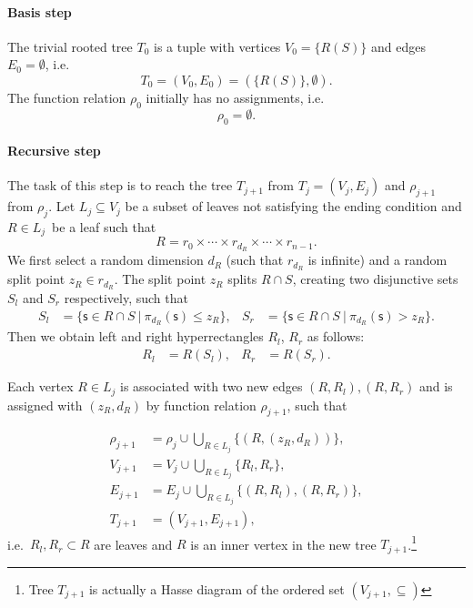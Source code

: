 \paragraph{Basis step}
The trivial rooted tree \(T_0\) is a tuple with
vertices \(V_0 = \{R(S)\}\) and edges \(E_0 = \emptyset\), i.e. 
\[T_0= (V_0, E_0) = (\{R(S)\},\emptyset).\]
The function relation $\rho_0$ initially has no assignments, i.e.
$$\rho_0 = \emptyset.$$

\paragraph{Recursive step}
The task of this step is to reach the tree \(T_{j+1}\) from \(T_{j} = (V_j, E_j)\) and $\rho_{j+1}$ from $\rho_{j}.$
Let \(L_j \subseteq V_j\) be a subset of leaves not satisfying the
ending condition
and \(R \in L_j\)\ be a leaf such that
\[R =  r_0 \times \cdots \times r_{d_R} \times \cdots \times r_{n-1}. \]
We first select a random dimension $d_R$ (such that $r_{d_R}$ is infinite) and a random split point $z_R \in r_{d_R}$.
The split point $z_R$ splits $R \cap S$, creating two disjunctive sets $S_l$ and $S_r$ respectively, such that
\begin{align*}
S_l &= \{ \mathsf{s} \in{R \cap S}\ |\ \pi_{d_R}(\mathsf{s})\le z_R\},&
S_r &= \{ \mathsf{s} \in{R \cap S}\ |\ \pi_{d_R}(\mathsf{s}) > z_R\}.
\end{align*}
Then we obtain left and right hyperrectangles \(R_l\), \(R_r\) as
follows:
\begin{align*}
R_l &= R(S_l),&
R_r &= R(S_r).
\end{align*}

Each vertex \(R \in L_j\) is associated with two new
edges \((R,R_l ), (R, R_r)\) and is assigned with $(z_R,d_R)$ by function relation $\rho_{j+1}$, such that


\begin{align*}
   \rho_{j+1} &= \rho_j \cup \bigcup_{R \in L_j} \{(R, (z_R, d_R))\}, \\
   V_{j+1} &= V_j \cup \bigcup_{R \in L_j} \{R_l, R_r\}, \\
   E_{j+1} &= E_j \cup \bigcup_{R \in L_j} \{(R, R_l), (R,R_r)\},\\
   T_{j+1} &= (V_{j+1}, E_{j+1}),
\end{align*}
i.e.~${R_l, R_r} \subset R$ are leaves and $R$ is an inner vertex in the new tree
\(T_{j+1}\).\footnote{Tree \(T_{j+1}\) is actually a Hasse diagram of the ordered set
\((V_{j+1},\subseteq)\)}


